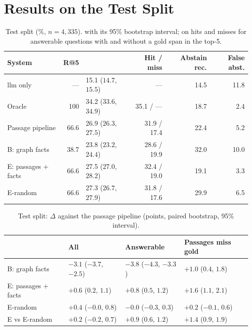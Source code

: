 \section{Results on the Test Split}\label{sec:final:test}

\begin{table}[ht]
    \centering
    \caption{Test split (\%, $n = 4{,}335$). \fone{} with its 95\% bootstrap interval;
    \fone{} on hits and misses for answerable questions with and without a gold span in
    the top-5.}
    \label{tab:final:test}
    \small
    \begin{tabular}{lrlrrr}
        \toprule
        System & R@5 & \fone{} & Hit / miss & Abstain rec. & False abst. \\
        \midrule
        \gls{llm} only          & ---  & 15.1 ($14.7$, $15.5$) & ---           & 14.5 & 11.8 \\
        Oracle                  & 100  & 34.2 ($33.6$, $34.9$) & 35.1 / ---    & 18.7 &  2.4 \\
        Passage pipeline        & 66.6 & 26.9 ($26.3$, $27.5$) & 31.9 / 17.4   & 22.4 &  5.2 \\
        B: graph facts          & 38.7 & 23.8 ($23.2$, $24.4$) & 28.6 / 19.9   & 32.0 & 10.0 \\
        E: passages + facts     & 66.6 & 27.5 ($27.0$, $28.2$) & 32.4 / 19.0   & 19.1 &  3.3 \\
        E-random                & 66.6 & 27.3 ($26.7$, $27.9$) & 31.8 / 17.6   & 29.9 &  6.5 \\
        \bottomrule
    \end{tabular}
\end{table}

\begin{table}[ht]
    \centering
    \caption{Test split: $\Delta$\fone{} against the passage pipeline (points, paired
    bootstrap, 95\% interval).}
    \label{tab:final:delta}
    \small
    \begin{tabular}{llll}
        \toprule
        & All & Answerable & Passages miss gold \\
        \midrule
        B: graph facts      & $-3.1$ ($-3.7$, $-2.5$) & $-3.8$ ($-4.3$, $-3.3$) & $+1.0$ ($0.4$, $1.8$) \\
        E: passages + facts & $+0.6$ ($0.2$, $1.1$)   & $+0.8$ ($0.5$, $1.2$)   & $+1.6$ ($1.1$, $2.1$) \\
        E-random            & $+0.4$ ($-0.0$, $0.8$)  & $-0.0$ ($-0.3$, $0.3$)  & $+0.2$ ($-0.1$, $0.6$) \\
        E vs E-random       & $+0.2$ ($-0.2$, $0.7$)  & $+0.9$ ($0.6$, $1.2$)   & $+1.4$ ($0.9$, $1.9$) \\
        \bottomrule
    \end{tabular}
\end{table}

